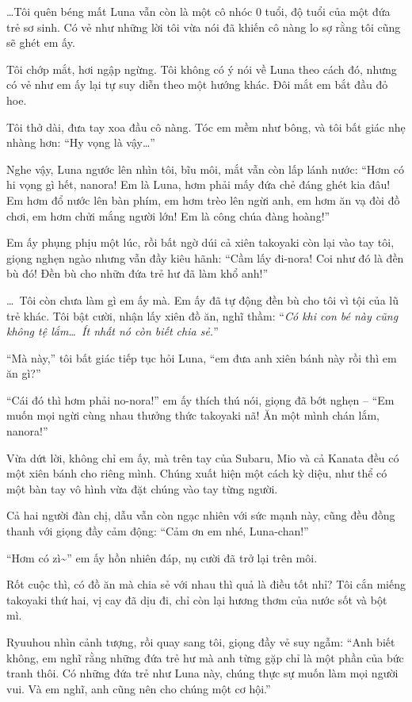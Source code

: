\documentclass[../main.tex]{subfiles}
\begin{document}
\dots Tôi quên béng mất Luna vẫn còn là một cô nhóc 0 tuổi, độ tuổi của một đứa trẻ sơ sinh. Có vẻ như những lời tôi vừa nói đã khiến cô nàng lo sợ rằng tôi cũng sẽ ghét em ấy.

Tôi chớp mắt, hơi ngập ngừng. Tôi không có ý nói về Luna theo cách đó, nhưng có vẻ như em ấy lại tự suy diễn theo một hướng khác. Đôi mắt em bắt đầu đỏ hoe.

Tôi thở dài, đưa tay xoa đầu cô nàng. Tóc em mềm như bông, và tôi bất giác nhẹ nhàng hơn: ``Hy vọng là vậy\dots''

Nghe vậy, Luna ngước lên nhìn tôi, bĩu môi, mắt vẫn còn lấp lánh nước: ``Hơm có hi vọng gì hết, nanora! Em là Luna, hơm phải mấy đứa chẻ đáng ghét kia đâu! Em hơm đổ nước lên bàn phím, em hơm trèo lên ngừi anh, em hơm ăn vạ đòi đồ chơi, em hơm chửi mắng người lớn! Em là công chúa đàng hoàng!''

Em ấy phụng phịu một lúc, rồi bất ngờ dúi cả xiên takoyaki còn lại vào tay tôi, giọng nghẹn ngào nhưng vẫn đầy kiêu hãnh: ``Cầm lấy đi-nora! Coi như đó là đền bù đó! Đền bù cho nhữn đứa trẻ hư đã làm khổ anh!''

\dots\ Tôi còn chưa làm gì em ấy mà. Em ấy đã tự động đền bù cho tôi vì tội của lũ trẻ khác. Tôi bật cười, nhận lấy xiên đồ ăn, nghĩ thầm: ``\textit{Có khi con bé này cũng không tệ lắm\dots\ Ít nhất nó còn biết chia sẻ.}''

``Mà này,'' tôi bất giác tiếp tục hỏi Luna, ``em đưa anh xiên bánh này rồi thì em ăn gì?''

``Cái đó thì hơm phải no-nora!'' em ấy thích thú nói, giọng đã bớt nghẹn – ``Em muốn mọi ngừi cùng nhau thưởng thức takoyaki nã! Ăn một mình chán lắm, nanora!''

Vừa dứt lời, không chỉ em ấy, mà trên tay của Subaru, Mio và cả Kanata đều có một xiên bánh cho riêng mình. Chúng xuất hiện một cách kỳ diệu, như thể có một bàn tay vô hình vừa đặt chúng vào tay từng người.

Cả hai người đàn chị, dẫu vẫn còn ngạc nhiên với sức mạnh này, cũng đều đồng thanh với giọng đầy cảm động: ``Cảm ơn em nhé, Luna-chan!''

``Hơm có zì\~{}'' em ấy hồn nhiên đáp, nụ cười đã trở lại trên môi.

Rốt cuộc thì, có đồ ăn mà chia sẻ với nhau thì quả là điều tốt nhỉ? Tôi cắn miếng takoyaki thứ hai, vị cay đã dịu đi, chỉ còn lại hương thơm của nước sốt và bột mì.

Ryuuhou nhìn cảnh tượng, rồi quay sang tôi, giọng đầy vẻ suy ngẫm: ``Anh biết không, em nghĩ rằng những đứa trẻ hư mà anh từng gặp chỉ là một phần của bức tranh thôi. Có những đứa trẻ như Luna này, chúng thực sự muốn làm mọi người vui. Và em nghĩ, anh cũng nên cho chúng một cơ hội.''
\end{document}

